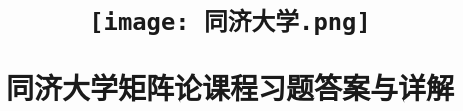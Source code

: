 \def\myTitle{同济大学矩阵论课程习题答案与详解}
% 


\title{
    \begin{figure}[!h]
        \centering
        \texttt{[image: 同济大学.png]}
        \label{同济大学}
    \end{figure}

    {\Huge{\textbf{\myTitle}}}}
\author{}
\date{}
\maketitle




